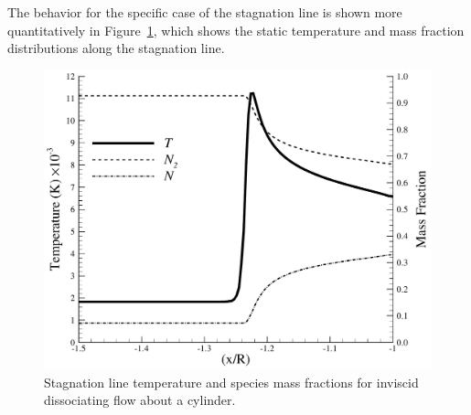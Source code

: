 The behavior for the specific case of the stagnation line is shown more quantitatively in Figure~\ref{fig:hornung_stag_line}, which shows the static temperature and mass fraction distributions along the stagnation line.
\begin{figure}
  \includegraphics[width=\textwidth]{figures/hornung_N2_cylinder/stagline}
  \caption{Stagnation line temperature and species mass fractions for inviscid dissociating flow about a cylinder.\label{fig:hornung_stag_line}}
\end{figure}

